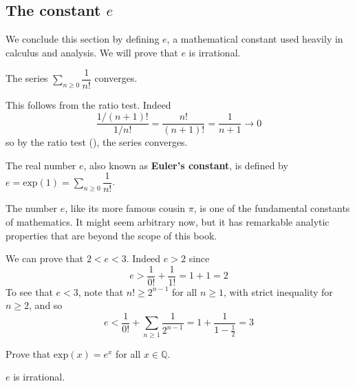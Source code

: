 \subsection*{The constant $e$}

We conclude this section by defining $e$, a mathematical constant used heavily in calculus and analysis. We will prove that $e$ is irrational.

\begin{lemma}
The series $\displaystyle \sum_{n \ge 0} \dfrac{1}{n!}$ converges.
\end{lemma}

\begin{cproof}
This follows from the ratio test. Indeed
\[ \dfrac{1/(n+1)!}{1/n!} = \dfrac{n!}{(n+1)!} = \dfrac{1}{n+1} \to 0 \]
so by the ratio test (), the series converges.
\end{cproof}

\begin{definition}
\label{defE}
The real number $e$, also known as \textbf{Euler's constant}, is defined by $e = \mathrm{exp}(1) = \sum_{n \ge 0} \dfrac{1}{n!}$.
\end{definition}

The number $e$, like its more famous cousin $\pi$, is one of the fundamental constants of mathematics. It might seem arbitrary now, but it has remarkable analytic properties that are beyond the scope of this book.

\begin{example}
We can prove that $2<e<3$. Indeed $e>2$ since
\[ e > \frac{1}{0!} + \dfrac{1}{1!} = 1 + 1 = 2 \]
To see that $e < 3$, note that $n! \ge 2^{n-1}$ for all $n \ge 1$, with strict inequality for $n \ge 2$, and so
\[ e < \frac{1}{0!} + \sum_{n \ge 1} \dfrac{1}{2^{n-1}} = 1 + \dfrac{1}{1-\frac{1}{2}} = 3 \]
\end{example}

\begin{exercise}
Prove that $\mathrm{exp}(x) = e^x$ for all $x \in \mathbb{Q}$.
\end{exercise}

\begin{theorem}
$e$ is irrational.
\end{theorem}

